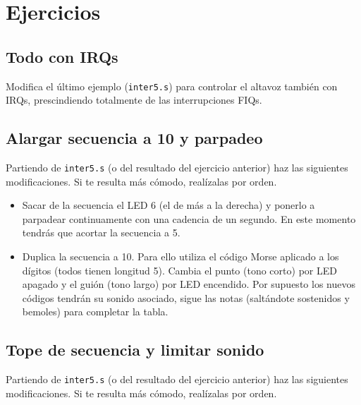 \section{Ejercicios}

\subsection{Todo con IRQs}

Modifica el último ejemplo ({\tt inter5.s}) para controlar el altavoz también con IRQs,
prescindiendo totalmente de las interrupciones FIQs.

\subsection{Alargar secuencia a 10 y parpadeo}

Partiendo de {\tt inter5.s} (o del resultado del ejercicio anterior) haz las siguientes
modificaciones. Si te resulta más cómodo, realízalas por orden.

\begin{itemize}
  \item Sacar de la secuencia el LED 6 (el de más a la derecha) y ponerlo a parpadear
        continuamente con una cadencia de un segundo. En este momento tendrás que acortar
        la secuencia a 5.
  \item Duplica la secuencia a 10. Para ello utiliza el código Morse aplicado a los dígitos
        (todos tienen longitud 5). Cambia el punto (tono corto) por LED apagado y el guión
        (tono largo) por LED encendido. Por supuesto los nuevos códigos tendrán su sonido
        asociado, sigue las notas (saltándote sostenidos y bemoles) para completar la tabla.
\end{itemize}

\subsection{Tope de secuencia y limitar sonido}

Partiendo de {\tt inter5.s} (o del resultado del ejercicio anterior) haz las siguientes
modificaciones. Si te resulta más cómodo, realízalas por orden.

